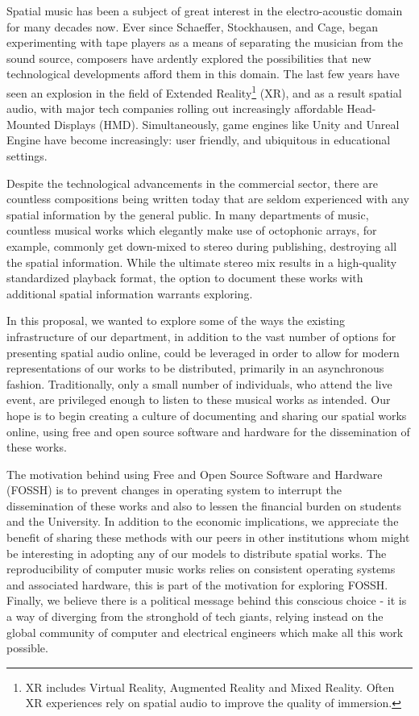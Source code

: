 Spatial music has been a subject of great interest in the electro-acoustic domain for many decades now. Ever since Schaeffer, Stockhausen, and Cage, began experimenting with tape players as a means of separating the musician from the sound source, composers have ardently explored the possibilities that new technological developments afford them in this domain. The last few years have seen an explosion in the field of Extended Reality\footnote{XR includes Virtual Reality, Augmented Reality and Mixed Reality. Often XR experiences rely on spatial audio to improve the quality of immersion.} (XR), and as a result spatial audio, with major tech companies rolling out increasingly affordable Head-Mounted Displays (HMD). Simultaneously, game engines like Unity and Unreal Engine have become increasingly: user friendly, and ubiquitous in educational settings. 

Despite the technological advancements in the commercial sector, there are countless compositions being written today that are seldom experienced with any spatial information by the general public. In many departments of music, countless musical works which elegantly make use of octophonic arrays, for example, commonly get down-mixed to stereo during publishing, destroying all the spatial information. While the ultimate stereo mix results in a high-quality standardized playback format, the option to document these works with additional spatial information warrants exploring. 

In this proposal, we wanted to explore some of the ways the existing infrastructure of our department, in addition to the vast number of options for presenting spatial audio online, could be leveraged in order to allow for modern representations of our works to be distributed, primarily in an asynchronous fashion. Traditionally, only a small number of individuals, who attend the live event, are privileged enough to listen to these musical works as intended. Our hope is to begin creating a culture of documenting and sharing our spatial works online, using free and open source software and hardware for the dissemination of these works. 

The motivation behind using Free and Open Source Software and Hardware (FOSSH) is to prevent changes in operating system to interrupt the dissemination of these works and also to lessen the financial burden on students and the University. In addition to the economic implications, we appreciate the benefit of sharing these methods with our peers in other institutions whom might be interesting in adopting any of our models to distribute spatial works. The reproducibility of computer music works relies on consistent operating systems and associated hardware, this is part of the motivation for exploring FOSSH. Finally, we believe there is a political message behind this conscious choice - it is a way of diverging from the stronghold of tech giants, relying instead on the global community of computer and electrical engineers which make all this work possible. 

